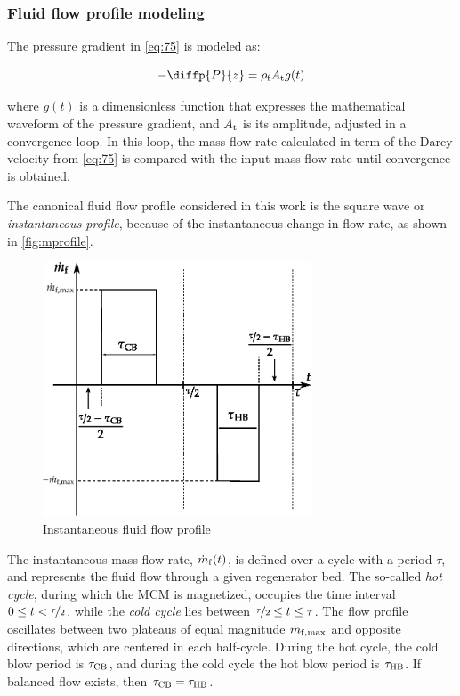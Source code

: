 \documentclass[referee]{svjour3}
\begin{document}
\subsubsection{Fluid flow profile modeling}
\label{sec:how-fluid-flow}

The pressure gradient in \autoref{eq:75} is modeled as:

\begin{equation}
\label{eq:76}
-\diffp{P}{z} = \rho\ped{f} A\ped{t} g(t)
\end{equation}

\noindent where \(g(t)\) is a dimensionless function that expresses the mathematical waveform of the pressure gradient, and  \(A_{\mathrm{t}}\) is its amplitude,  adjusted in a convergence loop. In this loop, the mass flow rate calculated in term of the Darcy velocity from \autoref{eq:75} is compared with the input   mass flow rate until convergence is obtained. %


The canonical fluid flow profile considered in this work is the square wave or \emph{instantaneous profile}, because of the instantaneous change in flow rate, as shown in \autoref{fig:mprofile}. 

\begin{figure}[!ht]
  \centering
  \includegraphics[width=8cm]{mprofile}
  \caption{Instantaneous fluid flow profile}
  \label{fig:mprofile}
\end{figure}

The instantaneous mass flow rate, \(\dot{m}_{\mathrm{f}}(t)\), is defined over a cycle with a period \(\tau\), and represents the fluid flow through a given regenerator bed. The so-called \emph{hot cycle}, during which the MCM is magnetized, occupies the time interval \(0 \le t < \nicefrac{\tau}{2}\), while the \emph{cold cycle} lies between \(\nicefrac{\tau}{2} \le t \le \tau\). The flow profile oscillates between two plateaus of equal magnitude
\(\dot{m}_{\mathrm{f,max}}\) and opposite directions, which are centered in each half-cycle. During the hot cycle, the cold
blow period is \(\tau_{\mathrm{CB}}\), and during the cold cycle the hot blow period is \(\tau_{\mathrm{HB}}\). If balanced flow exists, then \(\tau_{\mathrm{CB}} = \tau_{\mathrm{HB}}\).
\end{document}
